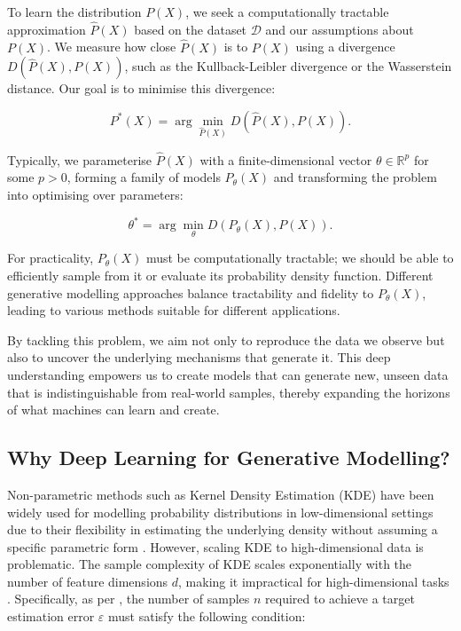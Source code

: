 To learn the distribution \( P(X) \), we seek a computationally tractable approximation \( \hat{P}(X) \) based on the dataset \( \mathcal{D} \) and our assumptions about \( P(X) \). We measure how close \( \hat{P}(X) \) is to \( P(X) \) using a divergence \( D(\hat{P}(X), P(X)) \), such as the Kullback-Leibler divergence or the Wasserstein distance. Our goal is to minimise this divergence:

\[
P^{\ast}(X) = \arg \min_{\hat{P}(X)} D(\hat{P}(X), P(X)).
\]

Typically, we parameterise \( \hat{P}(X) \) with a finite-dimensional vector \( \theta \in \mathbb{R}^p \) for some $p>0$, forming a family of models \( P_{\theta}(X) \) and transforming the problem into optimising over parameters:

\[
\theta^* = \arg \min_\theta D(P_{\theta}(X), P(X)).
\]

For practicality, \( P_{\theta}(X) \) must be computationally tractable; we should be able to efficiently sample from it or evaluate its probability density function. Different generative modelling approaches balance tractability and fidelity to \( P_{\theta}(X) \), leading to various methods suitable for different applications.

By tackling this problem, we aim not only to reproduce the data we observe but also to uncover the underlying mechanisms that generate it. This deep understanding empowers us to create models that can generate new, unseen data that is indistinguishable from real-world samples, thereby expanding the horizons of what machines can learn and create.

\subsection{Why Deep Learning for Generative Modelling?}

Non-parametric methods such as Kernel Density Estimation (KDE) have been widely used for modelling probability distributions in low-dimensional settings due to their flexibility in estimating the underlying density without assuming a specific parametric form \cite{silverman1986density}. However, scaling KDE to high-dimensional data is problematic. The sample complexity of KDE scales exponentially with the number of feature dimensions \( d \), making it impractical for high-dimensional tasks \cite{wasserman2006all}. Specifically, as per \cite{scott2015multivariate}, the number of samples \( n \) required to achieve a target estimation error \( \varepsilon \) must satisfy the following condition:

